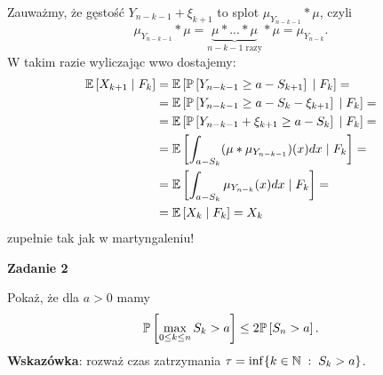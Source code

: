 \documentclass{article}
\newenvironment{zadanko}[1]{
  \bfseries{\large\color{orange}Zadanie #1}
}%
{}
\begin{document}
\begin{enumerate}
    Zauważmy, że gęstość $Y_{n-k-1}+\xi_{k+1}$ to splot $\mu_{Y_{n-k-1}}\ast \mu$, czyli 
    $$\mu_{Y_{n-k-1}}\ast\mu=\underbrace{\mu\ast...\ast \mu}_{n-k-1\text{ razy}}\ast\mu=\mu_{Y_{n-k}}.$$
    W takim razie wyliczając wwo dostajemy:
    \begin{align*}
      \expected{X_{k+1}}{F_k}&=\expected{\prob{Y_{n-k-1}\geq a-S_{k+1}}}{F_k}=\\
                             &=\expected{\prob{Y_{n-k-1}\geq a-S_k-\xi_{k+1}}}{F_k}=\\ 
                             &=\expected{\prob{Y_{n-k-1}+\xi_{k+1}\geq a-S_k}}{F_k}=\\ 
                             &=\expected{\int_{a-S_k}(\mu\ast \mu_{Y_{n-k-1}})(x)dx}{F_k}=\\ 
                             &=\expected{\int_{a-S_k}\mu_{Y_{n-k}}(x)dx}{F_k}=\\ 
                             &=\expected{X_k}{F_k}=X_k
    \end{align*}
    zupełnie tak jak w martyngaleniu!
\end{enumerate}

\begin{zadanko}{2}
  Pokaż, że dla $a>0$ mamy
  $$\prob{\max_{0\leq k\leq n}S_k>a}\leq 2\prob{S_n>a}.$$
  \textbf{Wskazówka}: rozważ czas zatrzymania $\tau=\inf\{k\in\operatorname{\mathbb{N}}\;:\;S_k>a\}$.
\end{zadanko}
\end{document}
